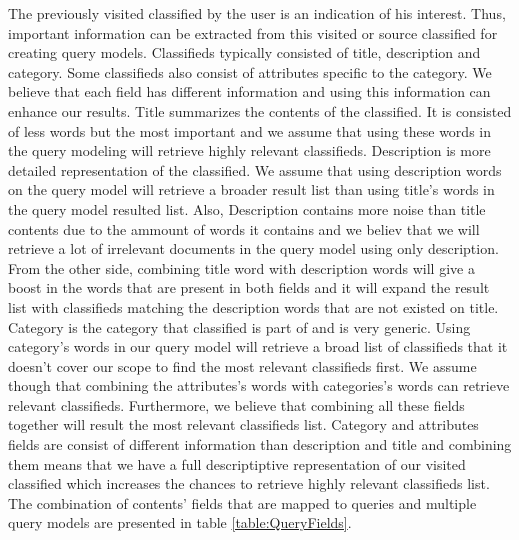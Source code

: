 The previously visited classified by the user is an indication of his interest. Thus, important information can be extracted from this visited or source classified for creating query models. Classifieds typically consisted of title, description and category. Some classifieds also consist of attributes specific to the category. We believe that each field has different information and using this information can enhance our results. Title summarizes the contents of the classified. It is consisted of less words but the most important and we assume that using these words in the query modeling will retrieve highly relevant classifieds. Description is more detailed representation of the classified. We assume that using description words on the query model will retrieve a broader result list than using title's words in the query model resulted list. Also, Description contains more noise than title contents due to the ammount of words it contains and we believ that we will retrieve a lot of irrelevant documents in the query model using only description. From the other side, combining title word with description words will give a boost in the words that are present in both fields and it will expand the result list with classifieds matching the description words that are not existed on title. Category is the category that classified is part of and is very generic. Using category's words in our query model will retrieve a broad list of classifieds that it doesn't cover our scope to find the most relevant classifieds first. We assume though that combining the attributes's words with categories's words can retrieve relevant classifieds. Furthermore, we believe that combining all these fields together will result the most relevant classifieds list. Category and attributes fields are consist of different information than description and title and combining them means that we have a full descriptiptive representation of our visited classified which increases the chances to retrieve highly relevant classifieds list. The combination of contents' fields that are mapped to queries and multiple query models are presented in table \ref{table:QueryFields}.


